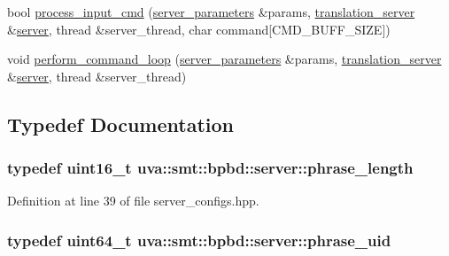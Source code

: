 \begin{DoxyCompactItemize}
\item 
bool \hyperlink{namespaceuva_1_1smt_1_1bpbd_1_1server_a4385d92deb1529577d431efd2aa5d892}{process\+\_\+input\+\_\+cmd} (\hyperlink{structuva_1_1smt_1_1bpbd_1_1server_1_1server__parameters}{server\+\_\+parameters} \&params, \hyperlink{classuva_1_1smt_1_1bpbd_1_1server_1_1translation__server}{translation\+\_\+server} \&\hyperlink{classwebsocketpp_1_1server}{server}, thread \&server\+\_\+thread, char command\mbox{[}C\+M\+D\+\_\+\+B\+U\+F\+F\+\_\+\+S\+I\+Z\+E\mbox{]})
\item 
void \hyperlink{namespaceuva_1_1smt_1_1bpbd_1_1server_ae58e404a227b2fc3b03fea84f7e91a83}{perform\+\_\+command\+\_\+loop} (\hyperlink{structuva_1_1smt_1_1bpbd_1_1server_1_1server__parameters}{server\+\_\+parameters} \&params, \hyperlink{classuva_1_1smt_1_1bpbd_1_1server_1_1translation__server}{translation\+\_\+server} \&\hyperlink{classwebsocketpp_1_1server}{server}, thread \&server\+\_\+thread)
\end{DoxyCompactItemize}


\subsection{Typedef Documentation}
\hypertarget{namespaceuva_1_1smt_1_1bpbd_1_1server_af068a19c2e03116caf3e3827a3e40e35}{}
\subsubsection[{phrase\+\_\+length}]{\setlength{\rightskip}{0pt plus 5cm}typedef uint16\+\_\+t {\bf uva\+::smt\+::bpbd\+::server\+::phrase\+\_\+length}}\label{namespaceuva_1_1smt_1_1bpbd_1_1server_af068a19c2e03116caf3e3827a3e40e35}


Definition at line 39 of file server\+\_\+configs.\+hpp.

\hypertarget{namespaceuva_1_1smt_1_1bpbd_1_1server_ad18d4cdf5504e76c22b0c124ff60b44f}{}
\subsubsection[{phrase\+\_\+uid}]{\setlength{\rightskip}{0pt plus 5cm}typedef uint64\+\_\+t {\bf uva\+::smt\+::bpbd\+::server\+::phrase\+\_\+uid}}\label{namespaceuva_1_1smt_1_1bpbd_1_1server_ad18d4cdf5504e76c22b0c124ff60b44f}



